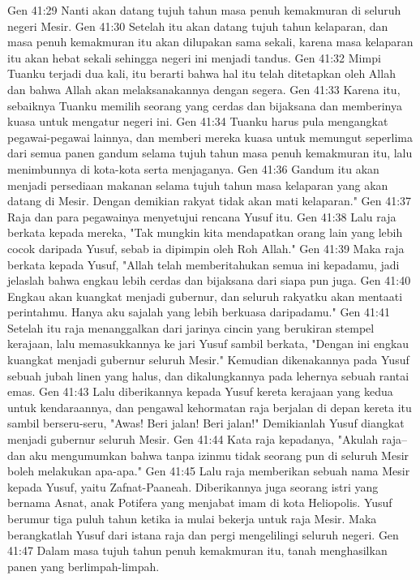 Gen 41:29  Nanti akan datang tujuh tahun masa penuh kemakmuran di seluruh negeri Mesir.
Gen 41:30  Setelah itu akan datang tujuh tahun kelaparan, dan masa penuh kemakmuran itu akan dilupakan sama sekali, karena masa kelaparan itu akan hebat sekali sehingga negeri ini menjadi tandus.
Gen 41:32  Mimpi Tuanku terjadi dua kali, itu berarti bahwa hal itu telah ditetapkan oleh Allah dan bahwa Allah akan melaksanakannya dengan segera.
Gen 41:33  Karena itu, sebaiknya Tuanku memilih seorang yang cerdas dan bijaksana dan memberinya kuasa untuk mengatur negeri ini.
Gen 41:34  Tuanku harus pula mengangkat pegawai-pegawai lainnya, dan memberi mereka kuasa untuk memungut seperlima dari semua panen gandum selama tujuh tahun masa penuh kemakmuran itu, lalu menimbunnya di kota-kota serta menjaganya.
Gen 41:36  Gandum itu akan menjadi persediaan makanan selama tujuh tahun masa kelaparan yang akan datang di Mesir. Dengan demikian rakyat tidak akan mati kelaparan."
Gen 41:37  Raja dan para pegawainya menyetujui rencana Yusuf itu.
Gen 41:38  Lalu raja berkata kepada mereka, "Tak mungkin kita mendapatkan orang lain yang lebih cocok daripada Yusuf, sebab ia dipimpin oleh Roh Allah."
Gen 41:39  Maka raja berkata kepada Yusuf, "Allah telah memberitahukan semua ini kepadamu, jadi jelaslah bahwa engkau lebih cerdas dan bijaksana dari siapa pun juga.
Gen 41:40  Engkau akan kuangkat menjadi gubernur, dan seluruh rakyatku akan mentaati perintahmu. Hanya aku sajalah yang lebih berkuasa daripadamu."
Gen 41:41  Setelah itu raja menanggalkan dari jarinya cincin yang berukiran stempel kerajaan, lalu memasukkannya ke jari Yusuf sambil berkata, "Dengan ini engkau kuangkat menjadi gubernur seluruh Mesir." Kemudian dikenakannya pada Yusuf sebuah jubah linen yang halus, dan dikalungkannya pada lehernya sebuah rantai emas.
Gen 41:43  Lalu diberikannya kepada Yusuf kereta kerajaan yang kedua untuk kendaraannya, dan pengawal kehormatan raja berjalan di depan kereta itu sambil berseru-seru, "Awas! Beri jalan! Beri jalan!" Demikianlah Yusuf diangkat menjadi gubernur seluruh Mesir.
Gen 41:44  Kata raja kepadanya, "Akulah raja--dan aku mengumumkan bahwa tanpa izinmu tidak seorang pun di seluruh Mesir boleh melakukan apa-apa."
Gen 41:45  Lalu raja memberikan sebuah nama Mesir kepada Yusuf, yaitu Zafnat-Paaneah. Diberikannya juga seorang istri yang bernama Asnat, anak Potifera yang menjabat imam di kota Heliopolis. Yusuf berumur tiga puluh tahun ketika ia mulai bekerja untuk raja Mesir. Maka berangkatlah Yusuf dari istana raja dan pergi mengelilingi seluruh negeri.
Gen 41:47  Dalam masa tujuh tahun penuh kemakmuran itu, tanah menghasilkan panen yang berlimpah-limpah.
